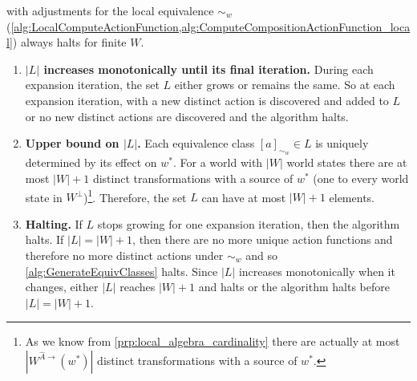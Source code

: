 \begin{propositionE}
     with adjustments for the local equivalence $\sim_{w}$ (\cref{alg:LocalComputeActionFunction,alg:ComputeCompositionActionFunction_local}) always halts for finite $W$.
\end{propositionE}
\begin{proofE}
\begin{enumerate}[(1)]
    \item \textbf{$|L|$ increases monotonically until its final iteration.}
    During each expansion iteration, the set $L$ either grows or remains the same.
    So at each expansion iteration, with a new distinct action is discovered and added to $L$ or no new distinct actions are discovered and the algorithm halts.

    \item \textbf{Upper bound on $|L|$.}
    Each equivalence class $[a]_{\sim_{w}} \in L$ is uniquely determined by its effect on $w^{*}$.
    For a world with $|W|$ world states there are at most $|W| + 1$ distinct transformations with a source of $w^{*}$ (one to every world state in $W^{\bot}$)\footnote{
    As we know from \cref{prp:local_algebra_cardinality} there are actually at most $|W^{\hat{A}\to}(w^{*})|$ distinct transformations with a source of $w^{*}$.
    }.
    Therefore, the set $L$ can have at most $|W|+1$ elements.

    \item \textbf{Halting.}
    If $L$ stops growing for one expansion iteration, then the algorithm halts.
    If $|L| = |W|+1$, then there are no more unique action functions and therefore no more distinct actions under $\sim_{w}$ and so \cref{alg:GenerateEquivClasses} halts.
    Since $|L|$ increases monotonically when it changes, either $|L|$ reaches $|W|+1$ and halts or the algorithm halts before $|L|=|W|+1$.
\end{enumerate}
\end{proofE}

